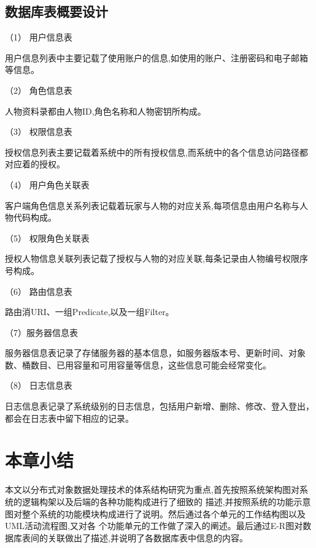 \subsection{数据库表概要设计}



（1） 用户信息表

用户信息列表中主要记载了使用账户的信息,如使用的账户、注册密码和电子邮箱等信息。

（2） 角色信息表

人物资料录都由人物ID,角色名称和人物密钥所构成。

（3） 权限信息表

授权信息列表主要记载着系统中的所有授权信息,而系统中的各个信息访问路径都对应着的授权。

（4） 用户角色关联表

客户端角色信息关系列表记载着玩家与人物的对应关系,每项信息由用户名称与人物代码构成。

（5） 权限角色关联表

授权人物信息关联列表记载了授权与人物的对应关联,每条记录由人物编号权限序号构成。

（6） 路由信息表

路由消URI、一组Predicate,以及一组Filter。

（7）服务器信息表

服务器信息表记录了存储服务器的基本信息，如服务器版本号、更新时间、对象数、桶数目、已用容量和可用容量等信息，这些信息可能会经常变化。

（8） 日志信息表

日志信息表记录了系统级别的日志信息，包括用户新增、删除、修改、登入登出，都会在日志表中留下相应的记录。

\section{本章小结}

本文以分布式对象数据处理技术的体系结构研究为重点,首先按照系统架构图对系统的逻辑构架以及后端的各种功能构成进行了细致的
描述,并按照系统的功能示意图对整个系统的功能模块构成进行了说明。然后通过各个单元的工作结构图以及UML活动流程图,又对各
个功能单元的工作做了深入的阐述。最后通过E-R图对数据库表间的关联做出了描述,并说明了各数据库表中信息的内容。